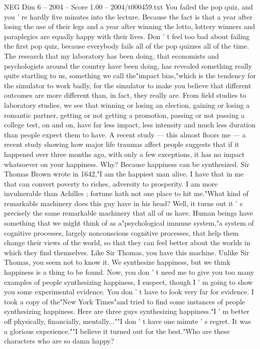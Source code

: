 \begin{textsample}{NEG Dim 6 – 2004 – Score 1.00 – 2004/t000459.txt}
You failed the pop quiz, and you ' re hardly five minutes into the lecture.
Because the fact is that a year after losing the use of their legs and a year after winning the lotto, lottery winners and paraplegics are equally happy with their lives.
Don ' t feel too bad about failing the first pop quiz, because everybody fails all of the pop quizzes all of the time.
The research that my laboratory has been doing, that economists and psychologists around the country have been doing, has revealed something really quite startling to us, something we call the"impact bias,"which is the tendency for the simulator to work badly, for the simulator to make you believe that different outcomes are more different than, in fact, they really are.
From field studies to laboratory studies, we see that winning or losing an election, gaining or losing a romantic partner, getting or not getting a promotion, passing or not passing a college test, on and on, have far less impact, less intensity and much less duration than people expect them to have.
A recent study — this almost floors me — a recent study showing how major life traumas affect people suggests that if it happened over three months ago, with only a few exceptions, it has no impact whatsoever on your happiness.
Why?
Because happiness can be synthesized.
Sir Thomas Brown wrote in 1642,"I am the happiest man alive.
I have that in me that can convert poverty to riches, adversity to prosperity.
I am more invulnerable than Achilles ; fortune hath not one place to hit me."What kind of remarkable machinery does this guy have in his head?
Well, it turns out it ' s precisely the same remarkable machinery that all of us have.
Human beings have something that we might think of as a"psychological immune system,"a system of cognitive processes, largely nonconscious cognitive processes, that help them change their views of the world, so that they can feel better about the worlds in which they find themselves.
Like Sir Thomas, you have this machine.
Unlike Sir Thomas, you seem not to know it.
We synthesize happiness, but we think happiness is a thing to be found.
Now, you don ' t need me to give you too many examples of people synthesizing happiness, I suspect, though I ' m going to show you some experimental evidence.
You don ' t have to look very far for evidence.
I took a copy of the"New York Times"and tried to find some instances of people synthesizing happiness.
Here are three guys synthesizing happiness."I ' m better off physically, financially, mentally...""I don ' t have one minute ' s regret.
It was a glorious experience.""I believe it turned out for the best."Who are these characters who are so damn happy?

\end{textsample}
